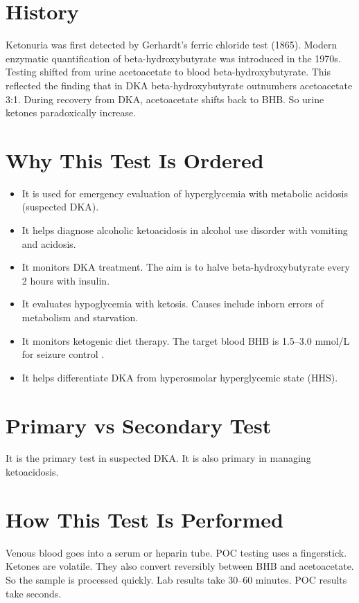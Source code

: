 \section*{History}
Ketonuria was first detected by Gerhardt's ferric chloride test (1865). Modern enzymatic quantification of beta-hydroxybutyrate was introduced in the 1970s. Testing shifted from urine acetoacetate to blood beta-hydroxybutyrate. This reflected the finding that in DKA beta-hydroxybutyrate outnumbers acetoacetate 3:1. During recovery from DKA, acetoacetate shifts back to BHB. So urine ketones paradoxically increase.

\section*{Why This Test Is Ordered}
\begin{itemize}
  \item It is used for emergency evaluation of hyperglycemia with metabolic acidosis (suspected DKA).
  \item It helps diagnose alcoholic ketoacidosis in alcohol use disorder with vomiting and acidosis.
  \item It monitors DKA treatment. The aim is to halve beta-hydroxybutyrate every 2 hours with insulin.
  \item It evaluates hypoglycemia with ketosis. Causes include inborn errors of metabolism and starvation.
  \item It monitors ketogenic diet therapy. The target blood BHB is 1.5--3.0 mmol/L for seizure control \cite{neal2008ketogenic}.
  \item It helps differentiate DKA from hyperosmolar hyperglycemic state (HHS).
\end{itemize}

\section*{Primary vs Secondary Test}
It is the primary test in suspected DKA. It is also primary in managing ketoacidosis.

\section*{How This Test Is Performed}
Venous blood goes into a serum or heparin tube. POC testing uses a fingerstick. Ketones are volatile. They also convert reversibly between BHB and acetoacetate. So the sample is processed quickly. Lab results take 30--60 minutes. POC results take seconds.

